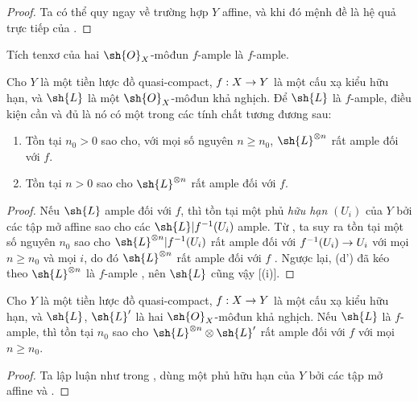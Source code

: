 \documentclass[oneside,10pt]{amsart}
\makeatletter
\renewcommand{\geq}{\geqslant}
\newcommand{\ega@arrow}[2]{\mathchoice{#1}{#2}{#2}{#2}}
\renewcommand{\to}{\ega@arrow{\longrightarrow}{\rightarrow}}
\let\EGAOriginalLabel\label
\renewcommand{\label}[1]{\phantomsection\EGAOriginalLabel{#1}}
\makeatother
\begin{document}
\begin{proof}
Ta có thể quy ngay về trường hợp $Y$ affine, và khi đó mệnh đề là hệ quả trực tiếp của .
\end{proof}

\begin{corollary}[4.6.10]
\label{II.4.6.10}
Tích tenxơ của hai $\sh{O}_X$-môđun $f$-ample là $f$-ample.
\end{corollary}

\begin{proposition}[4.6.11]
\label{II.4.6.11}
Cho $Y$ là một tiền lược đồ quasi-compact, $f:X\to Y$ là một cấu xạ kiểu hữu hạn, và $\sh{L}$ là một $\sh{O}_X$-môđun khả nghịch.
Để $\sh{L}$ là $f$-ample, điều kiện cần và đủ là nó có một trong các tính chất tương đương sau:
\begin{enumerate}
  \item[\rm{(d)}] Tồn tại $n_0>0$ sao cho, với mọi số nguyên $n\geq n_0$, $\sh{L}^{\otimes n}$ rất ample đối với $f$.
  \item[\rm{(d')}] Tồn tại $n>0$ sao cho $\sh{L}^{\otimes n}$ rất ample đối với $f$.
\end{enumerate}
\end{proposition}

\begin{proof}
Nếu $\sh{L}$ ample đối với $f$, thì tồn tại một phủ \emph{hữu hạn} $(U_i)$ của $Y$ bởi các tập mở affine sao cho các $\sh{L}|f^{-1}(U_i)$ ample.
Từ , ta suy ra tồn tại một số nguyên $n_0$ sao cho $\sh{L}^{\otimes n}|f^{-1}(U_i)$ rất ample đối với $f^{-1}(U_i)\to U_i$ với mọi $n\geq n_0$ và mọi $i$, do đó $\sh{L}^{\otimes n}$ rất ample đối với $f$ .
Ngược lại, (d') đã kéo theo $\sh{L}^{\otimes n}$ là $f$-ample , nên $\sh{L}$ cũng vậy [(i)].
\end{proof}

\begin{corollary}[4.6.12]
\label{II.4.6.12}
Cho $Y$ là một tiền lược đồ quasi-compact, $f:X\to Y$ là một cấu xạ kiểu hữu hạn, và $\sh{L}$, $\sh{L}'$ là hai $\sh{O}_X$-môđun khả nghịch.
Nếu $\sh{L}$ là $f$-ample, thì tồn tại $n_0$ sao cho $\sh{L}^{\otimes n}\otimes\sh{L}'$ rất ample đối với $f$ với mọi $n\geq n_0$.
\end{corollary}

\begin{proof}
Ta lập luận như trong , dùng một phủ hữu hạn của $Y$ bởi các tập mở affine và .
\end{proof}
\end{document}
